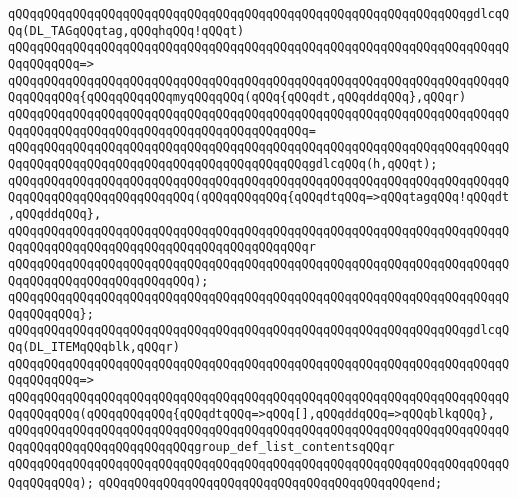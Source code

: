 \verb|qQQqqQQqqQQqqQQqqQQqqQQqqQQqqQQqqQQqqQQqqQQqqQQqqQQqqQQqqQQqqQQqgdlcqQQq(DL_TAGqQQqtag,qQQqhqQQq!qQQqt)|\newline
\verb|qQQqqQQqqQQqqQQqqQQqqQQqqQQqqQQqqQQqqQQqqQQqqQQqqQQqqQQqqQQqqQQqqQQqqQQqqQQqqQQq=>|\newline
\verb|qQQqqQQqqQQqqQQqqQQqqQQqqQQqqQQqqQQqqQQqqQQqqQQqqQQqqQQqqQQqqQQqqQQqqQQqqQQqqQQq{qQQqqQQqqQQqmyqQQqqQQq(qQQq{qQQqdt,qQQqddqQQq},qQQqr)|\newline
\verb|qQQqqQQqqQQqqQQqqQQqqQQqqQQqqQQqqQQqqQQqqQQqqQQqqQQqqQQqqQQqqQQqqQQqqQQqqQQqqQQqqQQqqQQqqQQqqQQqqQQqqQQqqQQqqQQq=|\newline
\verb|qQQqqQQqqQQqqQQqqQQqqQQqqQQqqQQqqQQqqQQqqQQqqQQqqQQqqQQqqQQqqQQqqQQqqQQqqQQqqQQqqQQqqQQqqQQqqQQqqQQqqQQqqQQqqQQqgdlcqQQq(h,qQQqt);|\newline
\newline
\verb|qQQqqQQqqQQqqQQqqQQqqQQqqQQqqQQqqQQqqQQqqQQqqQQqqQQqqQQqqQQqqQQqqQQqqQQqqQQqqQQqqQQqqQQqqQQqqQQq(qQQqqQQqqQQq{qQQqdtqQQq=>qQQqtagqQQq!qQQqdt,qQQqddqQQq},|\newline
\verb|qQQqqQQqqQQqqQQqqQQqqQQqqQQqqQQqqQQqqQQqqQQqqQQqqQQqqQQqqQQqqQQqqQQqqQQqqQQqqQQqqQQqqQQqqQQqqQQqqQQqqQQqqQQqqQQqr|\newline
\verb|qQQqqQQqqQQqqQQqqQQqqQQqqQQqqQQqqQQqqQQqqQQqqQQqqQQqqQQqqQQqqQQqqQQqqQQqqQQqqQQqqQQqqQQqqQQqqQQq);|\newline
\verb|qQQqqQQqqQQqqQQqqQQqqQQqqQQqqQQqqQQqqQQqqQQqqQQqqQQqqQQqqQQqqQQqqQQqqQQqqQQqqQQq};|\newline
\newline
\verb|qQQqqQQqqQQqqQQqqQQqqQQqqQQqqQQqqQQqqQQqqQQqqQQqqQQqqQQqqQQqqQQqgdlcqQQq(DL_ITEMqQQqblk,qQQqr)|\newline
\verb|qQQqqQQqqQQqqQQqqQQqqQQqqQQqqQQqqQQqqQQqqQQqqQQqqQQqqQQqqQQqqQQqqQQqqQQqqQQqqQQq=>|\newline
\verb|qQQqqQQqqQQqqQQqqQQqqQQqqQQqqQQqqQQqqQQqqQQqqQQqqQQqqQQqqQQqqQQqqQQqqQQqqQQqqQQq(qQQqqQQqqQQq{qQQqdtqQQq=>qQQq[],qQQqddqQQq=>qQQqblkqQQq},|\newline
\verb|qQQqqQQqqQQqqQQqqQQqqQQqqQQqqQQqqQQqqQQqqQQqqQQqqQQqqQQqqQQqqQQqqQQqqQQqqQQqqQQqqQQqqQQqqQQqqQQqgroup_def_list_contentsqQQqr|\newline
\verb|qQQqqQQqqQQqqQQqqQQqqQQqqQQqqQQqqQQqqQQqqQQqqQQqqQQqqQQqqQQqqQQqqQQqqQQqqQQqqQQq);|\newline
\verb|qQQqqQQqqQQqqQQqqQQqqQQqqQQqqQQqqQQqqQQqqQQqend;|\newline
\newline
\newline

